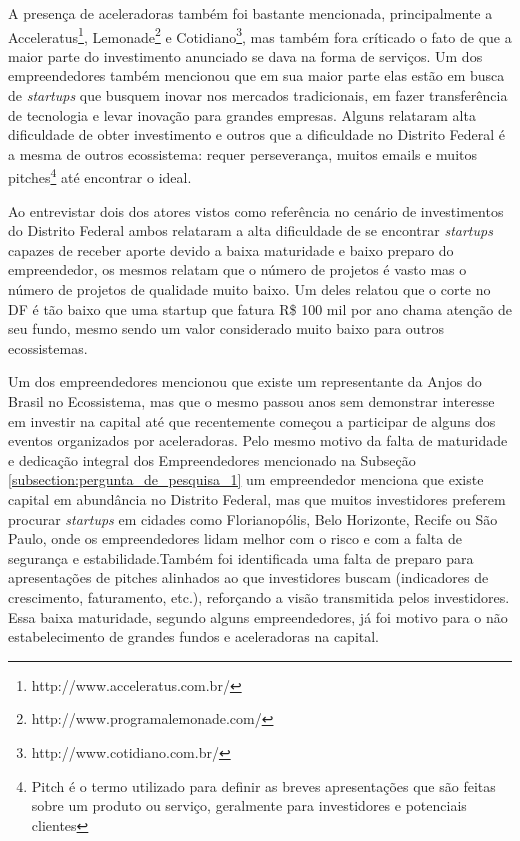 A presença de aceleradoras também foi bastante mencionada, principalmente a Acceleratus\footnote{http://www.acceleratus.com.br/}, Lemonade\footnote{http://www.programalemonade.com/} e Cotidiano\footnote{http://www.cotidiano.com.br/}, mas também fora críticado o fato de que a maior parte do investimento anunciado se dava na forma de serviços. Um dos empreendedores também mencionou que em sua maior parte elas estão em busca de \textit{startups} que busquem inovar nos mercados tradicionais, em fazer transferência de tecnologia e levar inovação para grandes empresas. Alguns relataram alta dificuldade de obter investimento e outros que a dificuldade no Distrito Federal é a mesma de outros ecossistema: requer perseverança, muitos emails e muitos pitches\footnote{Pitch é o termo utilizado para definir as breves apresentações que são feitas sobre um produto ou serviço, geralmente para investidores e potenciais clientes} até encontrar o ideal.

Ao entrevistar dois dos atores vistos como referência no cenário de investimentos do Distrito Federal ambos relataram a alta dificuldade de se encontrar \textit{startups} capazes de receber aporte devido a baixa maturidade e baixo preparo do empreendedor, os mesmos relatam que o número de projetos é vasto mas o número de projetos de qualidade muito baixo. Um deles relatou que o corte no DF é tão baixo que uma startup que fatura R\$ 100 mil por ano chama atenção de seu fundo, mesmo sendo um valor considerado muito baixo para outros ecossistemas. 

Um dos empreendedores mencionou que existe um representante da Anjos do Brasil no Ecossistema, mas que o mesmo passou anos sem demonstrar interesse em investir na capital até que recentemente começou a participar de alguns dos eventos organizados por aceleradoras. Pelo mesmo motivo da falta de maturidade e dedicação integral dos Empreendedores mencionado na Subseção \ref{subsection:pergunta_de_pesquisa_1} um empreendedor menciona que existe capital em abundância no Distrito Federal, mas que muitos investidores preferem procurar \textit{startups} em cidades como Florianopólis, Belo Horizonte, Recife ou São Paulo, onde os empreendedores lidam melhor com o risco e com a falta de segurança e estabilidade.Também foi identificada uma falta de preparo para apresentações de pitches alinhados ao que investidores buscam (indicadores de crescimento, faturamento, etc.), reforçando a visão transmitida pelos investidores. Essa baixa maturidade, segundo alguns empreendedores, já foi motivo para o não estabelecimento de grandes fundos e aceleradoras na capital.

